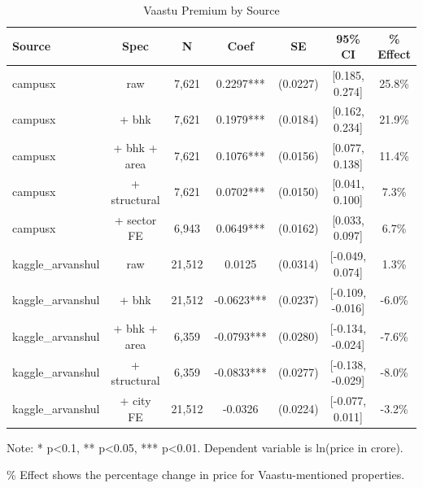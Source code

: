 \begin{table}[htbp]
\centering
\caption{Vaastu Premium by Source}
\begin{tabular}{lcccccc}
\toprule
Source & Spec & N & Coef & SE & 95\% CI & \% Effect \\
\midrule
campusx & raw & 7,621 & 0.2297*** & (0.0227) & [0.185, 0.274] & 25.8\% \\
campusx & + bhk & 7,621 & 0.1979*** & (0.0184) & [0.162, 0.234] & 21.9\% \\
campusx & + bhk + area & 7,621 & 0.1076*** & (0.0156) & [0.077, 0.138] & 11.4\% \\
campusx & + structural & 7,621 & 0.0702*** & (0.0150) & [0.041, 0.100] & 7.3\% \\
campusx & + sector FE & 6,943 & 0.0649*** & (0.0162) & [0.033, 0.097] & 6.7\% \\
kaggle_arvanshul & raw & 21,512 & 0.0125 & (0.0314) & [-0.049, 0.074] & 1.3\% \\
kaggle_arvanshul & + bhk & 21,512 & -0.0623*** & (0.0237) & [-0.109, -0.016] & -6.0\% \\
kaggle_arvanshul & + bhk + area & 6,359 & -0.0793*** & (0.0280) & [-0.134, -0.024] & -7.6\% \\
kaggle_arvanshul & + structural & 6,359 & -0.0833*** & (0.0277) & [-0.138, -0.029] & -8.0\% \\
kaggle_arvanshul & + city FE & 21,512 & -0.0326 & (0.0224) & [-0.077, 0.011] & -3.2\% \\
\bottomrule
\end{tabular}
\begin{tablenotes}
\small
\item Note: * p<0.1, ** p<0.05, *** p<0.01. Dependent variable is ln(price in crore).
\item \% Effect shows the percentage change in price for Vaastu-mentioned properties.
\end{tablenotes}
\end{table}